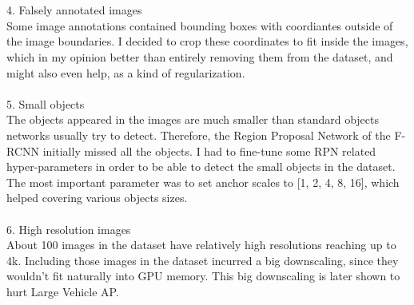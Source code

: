 \documentclass[]{article}
\begin{document}
\\\\
4. Falsely annotated images\\
Some image annotations contained bounding boxes with coordiantes outside of the image boundaries. I decided to crop these coordinates to fit inside the images, which in my opinion better than entirely removing them from the dataset, and might also even help, as a kind of regularization.
\\\\
5. Small objects\\
The objects appeared in the images are much smaller than standard objects networks usually try to detect. Therefore, the Region Proposal Network of the F-RCNN \cite{fasterrcnn} initially missed all the objects. I had to fine-tune some RPN related hyper-parameters in order to be able to detect the small objects in the dataset. The most important parameter was to set anchor scales to [1, 2, 4, 8, 16], which helped covering various objects sizes.
\\\\
6. High resolution images\\
About 100 images in the dataset have relatively high resolutions reaching up to 4k. Including those images in the dataset incurred a big downscaling, since they wouldn't fit naturally into GPU memory. This big downscaling is later shown to hurt Large Vehicle AP.
\end{document}
